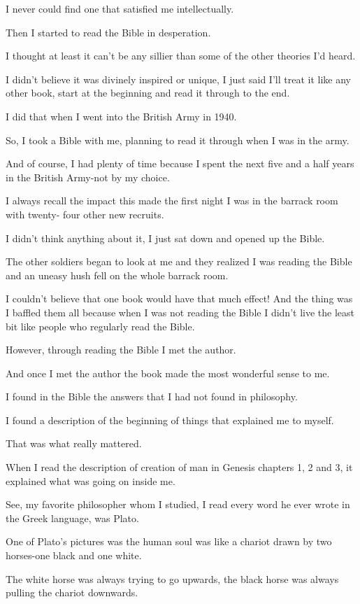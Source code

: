 \documentclass[11pt]{article}
\begin{document}
I never could find one that satisfied me
intellectually.

Then I started to read the Bible in
desperation.

I thought at least it can't be any sillier
than some of the other theories I'd heard.

I didn't believe it was divinely inspired or
unique, I just said I'll treat it like any
other book, start at the beginning and read it
through to the end.

I did that when I went into the British Army
in 1940.

So, I took a Bible with me, planning to read
it through when I was in the army.

And of course, I had plenty of time because I
spent the next five and a half years in the
British Army-not by my choice.

I always recall the impact this made the first
night I was in the barrack room with twenty-
four other new recruits.

I didn't think anything about it, I just sat
down and opened up the Bible.

The other soldiers began to look at me and
they realized I was reading the Bible and an
uneasy hush fell on the whole barrack room.

I couldn't believe that one book would have
that much effect! And the thing was I baffled
them all because when I was not reading the
Bible I didn't live the least bit like people
who regularly read the Bible.

However, through reading the Bible I met the
author.

And once I met the author the book made the
most wonderful sense to me.

I found in the Bible the answers that I had
not found in philosophy.

I found a description of the beginning of
things that explained me to myself.

That was what really mattered.

When I read the description of creation of man
in Genesis chapters 1, 2 and 3, it explained
what was going on inside me.

See, my favorite philosopher whom I studied, I
read every word he ever wrote in the Greek
language, was Plato.

One of Plato's pictures was the human soul was
like a chariot drawn by two horses-one black
and one white.

The white horse was always trying to go
upwards, the black horse was always pulling
the chariot downwards.
\end{document}
